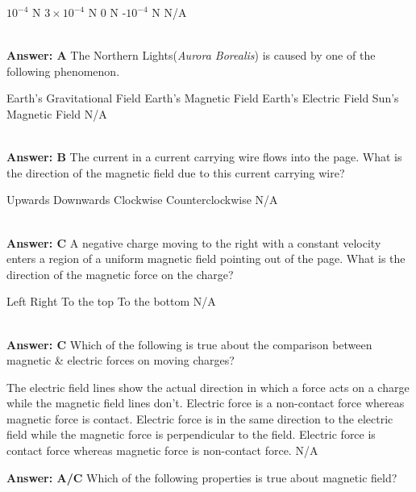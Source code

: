 \documentclass[12pt,addpoints]{exam}
\begin{document}
{{{\begin{questions}
\begin{oneparchoices}
						\choice $10^{-4}$ N
						\choice $3\times10^{-4}$ N
						\choice $0$ N
						\choice -$10^{-4}$ N
						\choice N/A
					\end{oneparchoices}\\ \textbf{Answer: A}
					\question The Northern Lights(\textit{Aurora Borealis}) is caused by one of the following phenomenon.\\ \begin{oneparchoices}
						\choice Earth's Gravitational Field
						\choice Earth's Magnetic Field
						\choice Earth's Electric Field
						\choice Sun's Magnetic Field
						\choice N/A
					\end{oneparchoices}\\ \textbf{Answer: B}
					\question The current in a current carrying wire flows into the page. What is the direction of the
					magnetic field due to this current carrying wire? \\ \begin{oneparchoices}
						\choice Upwards
						\choice Downwards
						\choice Clockwise
						\choice Counterclockwise
						\choice N/A
					\end{oneparchoices}\\ \textbf{Answer: C}
					\question A negative charge moving to the right with a constant velocity enters a region of a uniform magnetic field pointing out of the page. What is the direction of the magnetic force on the charge?\\ \begin{oneparchoices}
						\choice Left
						\choice Right
						\choice To the top
						\choice To the bottom
						\choice N/A
					\end{oneparchoices}	\\ \textbf{Answer: C}
					\question Which of the following is true about the comparison between magnetic \& electric forces on moving charges? \begin{choices}
						\choice The electric field lines show the actual direction in which a force acts on a charge while the magnetic field lines don't.
						\choice Electric force is a non-contact force whereas magnetic force is contact.
						\choice Electric force is in the same direction to the electric field while the magnetic force is perpendicular to the field. 
						\choice Electric force is contact force whereas magnetic force is non-contact force.
						\choice N/A
					\end{choices}\textbf{Answer: A/C}
					\question Which of the following properties is true about magnetic field?\begin{choices}

\end{choices}
\end{questions}}}}
\end{document}
